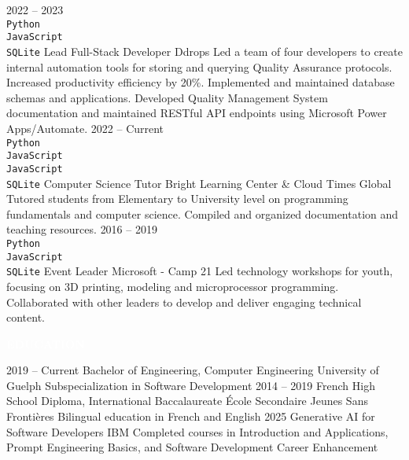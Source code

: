 \documentclass[9pt]{src/developercv} %
\begin{document}
\begin{entrylist}
	\entry
		{2022 -- 2023\\
		\footnotesize{\texttt{Python}}\hfill\\
		\footnotesize{\texttt{JavaScript}}\hfill\\
		\footnotesize{\texttt{SQLite}}\hfill}
		{Lead Full-Stack Developer}
		{Ddrops}
		{Led a team of four developers to create internal automation tools for storing and querying Quality Assurance protocols. Increased productivity efficiency by 20\%. Implemented and maintained database schemas and applications. Developed Quality Management System documentation and maintained RESTful API endpoints using Microsoft Power Apps/Automate.}
	\entry
		{2022 -- Current\\
		\footnotesize{\texttt{Python}}\hfill\\
		\footnotesize{\texttt{JavaScript}}\hfill\\
		\footnotesize{\texttt{JavaScript}}\hfill\\
		\footnotesize{\texttt{SQLite}}\hfill}
		{Computer Science Tutor}
		{Bright Learning Center \& Cloud Times Global}
		{Tutored students from Elementary to University level on programming fundamentals and computer science. Compiled and organized documentation and teaching resources.}
	\entry
		{2016 -- 2019\\		\footnotesize{\texttt{Python}}\hfill\\
		\footnotesize{\texttt{JavaScript}}\hfill\\
		\footnotesize{\texttt{SQLite}}\hfill}
		{Event Leader}
		{Microsoft - Camp 21}
		{Led technology workshops for youth, focusing on 3D printing, modeling and microprocessor programming. Collaborated with other leaders to develop and deliver engaging technical content.}
\end{entrylist}


\vspace{\baselineskip} %
\colorbox{cyan800}{\textcolor{white}{\MakeUppercase{\textbf{Education}}}}\\%

\begin{entrylist}
	\entry
		{2019 -- Current}
		{Bachelor of Engineering, Computer Engineering}
		{University of Guelph}
		{Subspecialization in Software Development}
	\entry
		{2014 -- 2019}
		{French High School Diploma, International Baccalaureate}
		{École Secondaire Jeunes Sans Frontières}
		{Bilingual education in French and English}
	\entry
		{2025}
		{Generative AI for Software Developers}
		{IBM}
		{Completed courses in Introduction and Applications, Prompt Engineering Basics, and Software Development Career Enhancement}
\end{entrylist}
\end{document}
